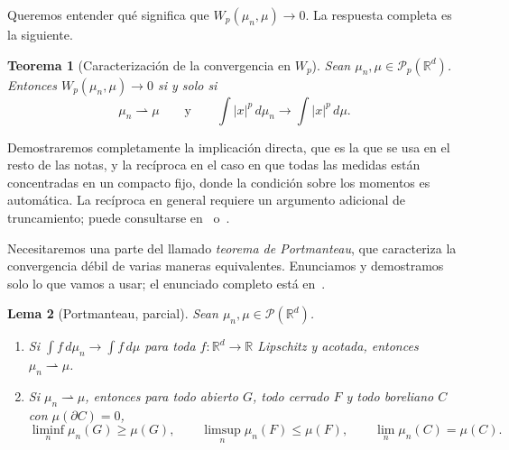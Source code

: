 \documentclass[12pt, a4paper]{amsbook}
\newcommand{\R}{{\mathbb R}}
\newtheorem{teo}{Teorema}[section]
\newtheorem{lema}[teo]{Lema}
\theoremstyle{remark}
\theoremstyle{definition}
\numberwithin{section}{chapter}
\numberwithin{subsection}{section}
\numberwithin{equation}{section}
\numberwithin{figure}{chapter}
\begin{document}
Queremos entender qué significa que $W_p(\mu_n,\mu)\to0$. La respuesta
completa es la siguiente.

\begin{teo}[Caracterización de la convergencia en $W_p$]\label{teo.Wp.convergencia}
Sean $\mu_n,\mu\in\mathcal P_p(\R^d)$. Entonces $W_p(\mu_n,\mu)\to0$ si y solo
si
\[
\mu_n\rightharpoonup\mu
\qquad\text{y}\qquad
\int|x|^p\,d\mu_n\longrightarrow\int|x|^p\,d\mu.
\]
\end{teo}

Demostraremos completamente la implicación directa, que es la que se usa en
el resto de las notas, y la recíproca en el caso en que todas las medidas
están concentradas en un compacto fijo, donde la condición sobre los momentos
es automática. La recíproca en general requiere un argumento adicional de
truncamiento; puede consultarse en~\cite[Theorem~6.9]{Villani2009}
o~\cite[Theorem~5.11]{Santambrogio}.

Necesitaremos una parte del llamado \emph{teorema de Portmanteau}, que
caracteriza la convergencia débil de varias maneras equivalentes. Enunciamos
y demostramos solo lo que vamos a usar; el enunciado completo está
en~\cite[Theorem~2.1]{Billingsley}.

\begin{lema}[Portmanteau, parcial]\label{lema.portmanteau}
Sean $\mu_n,\mu\in\mathcal P(\R^d)$.
\begin{enumerate}
\item Si $\int f\,d\mu_n\to\int f\,d\mu$ para toda $f\colon\R^d\to\R$
Lipschitz y acotada, entonces $\mu_n\rightharpoonup\mu$.
\item Si $\mu_n\rightharpoonup\mu$, entonces para todo abierto $G$, todo
cerrado $F$ y todo boreliano $C$ con $\mu(\partial C)=0$,
\[
\liminf_n\mu_n(G)\ge\mu(G),
\qquad
\limsup_n\mu_n(F)\le\mu(F),
\qquad
\lim_n\mu_n(C)=\mu(C).
\]
\end{enumerate}
\end{lema}
\end{document}
